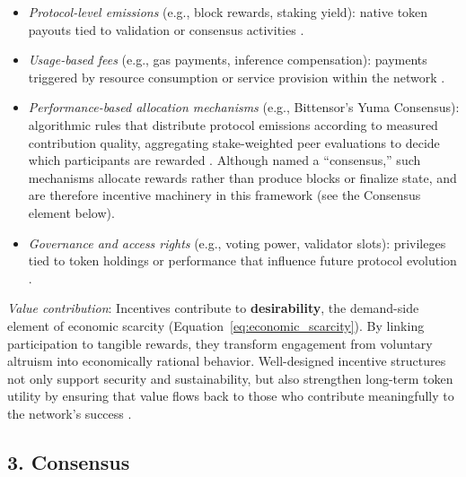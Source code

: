 \documentclass[12pt]{article}
\begin{document}
\begin{itemize}
    \item \textit{Protocol-level emissions} (e.g., block rewards, staking yield): native token payouts tied to validation or consensus activities \citep{gans2019economics, catalini2020some}.

    \item \textit{Usage-based fees} (e.g., gas payments, inference compensation): payments triggered by resource consumption or service provision within the network \citep{cong2021tokenomics, huberman2021monetizing}.

    \item \textit{Performance-based allocation mechanisms} (e.g., Bittensor's Yuma Consensus): algorithmic rules that distribute protocol emissions according to measured contribution quality, aggregating stake-weighted peer evaluations to decide which participants are rewarded \citep{rao2020bittensor, yuma2025yuma}. Although named a ``consensus,'' such mechanisms allocate rewards rather than produce blocks or finalize state, and are therefore incentive machinery in this framework (see the Consensus element below).

    \item \textit{Governance and access rights} (e.g., voting power, validator slots): privileges tied to token holdings or performance that influence future protocol evolution \citep{urquhart2022ethereum, buterin2022proof}.
\end{itemize}

\textit{Value contribution}: Incentives contribute to \textbf{desirability}, the demand-side element of economic scarcity (Equation~\ref{eq:economic_scarcity}). By linking participation to tangible rewards, they transform engagement from voluntary altruism into economically rational behavior. Well-designed incentive structures not only support security and sustainability, but also strengthen long-term token utility by ensuring that value flows back to those who contribute meaningfully to the network’s success \citep{biais2020blockchain, cong2021tokenomics, gans2019economics}.

\subsection*{3. Consensus}
\end{document}
